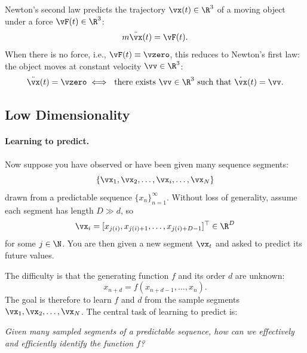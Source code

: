 \documentclass[../../book-main.tex]{subfiles}
\begin{document}
\begin{example}
    Newton's second law predicts the trajectory \(\vx(t) \in \R^{3}\)
    of a moving object under a force \(\vF(t) \in \R^{3}\):
    \begin{equation}
        m\ddot{\vx}(t) = \vF(t).
        \label{eqn:newton-second}
    \end{equation}
    When there is no force, i.e., \(\vF(t) \equiv \vzero\), this
    reduces to Newton's first law: the object moves at constant
    velocity \(\vv \in \R^{3}\):
    \begin{equation}
        \ddot{\vx}(t) = \vzero \iff \ \text{there exists } \vv \in
        \R^{3} \text{ such that } \dot{\vx}(t) = \vv.
        \label{eqn:newton-first}
    \end{equation}
\end{example}

\subsection{Low Dimensionality}\label{sec:intro-low-dimensionality}
\paragraph{Learning to predict.}
Now suppose you have observed or have been given many sequence segments:
\begin{equation}
    \{\vx_{1}, \vx_{2}, \ldots, \vx_{i}, \ldots, \vx_{N}\}
\end{equation}
drawn from a predictable sequence \(\{x_{n}\}_{n=1}^{\infty}\).
Without loss of generality, assume each segment has length \(D \gg d\), so
\begin{equation}
    \vx_{i} = [x_{j(i)}, x_{j(i)+1}, \ldots, x_{j(i)+D-1}]^{\top} \in \R^{D}
\end{equation}
for some \(j \in \N\). You are then given a new segment \(\vx_{t}\) and
asked to predict its future values.

The difficulty is that the generating function \(f\) and its order
\(d\) are unknown:
\begin{equation}
    x_{n+d} = f(x_{n+d-1}, \ldots, x_{n}).
    \label{eqn:sequence-order-d}
\end{equation}
The goal is therefore to learn \(f\) and \(d\) from the sample
segments \(\vx_{1}, \vx_{2}, \ldots, \vx_{N}\). The central task of
learning to predict is:
\begin{center}
    \textit{Given many sampled segments of a predictable sequence,
    how can we effectively and efficiently identify the function \(f\)?}
\end{center}
\end{document}
